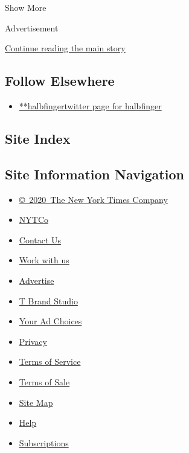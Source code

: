 Show More

Advertisement

\protect\hyperlink{after-mid2}{Continue reading the main story}

\hypertarget{follow-elsewhere}{%
\subsection{Follow Elsewhere}\label{follow-elsewhere}}

\begin{itemize}
\tightlist
\item
  \href{https://twitter.com/halbfinger}{**halbfingertwitter page for
  halbfinger}
\end{itemize}

\hypertarget{site-index}{%
\subsection{Site Index}\label{site-index}}

\hypertarget{site-information-navigation}{%
\subsection{Site Information
Navigation}\label{site-information-navigation}}

\begin{itemize}
\tightlist
\item
  \href{https://help.nytimes3xbfgragh.onion/hc/en-us/articles/115014792127-Copyright-notice}{©~2020~The
  New York Times Company}
\end{itemize}

\begin{itemize}
\tightlist
\item
  \href{https://www.nytco.com/}{NYTCo}
\item
  \href{https://help.nytimes3xbfgragh.onion/hc/en-us/articles/115015385887-Contact-Us}{Contact
  Us}
\item
  \href{https://www.nytco.com/careers/}{Work with us}
\item
  \href{https://nytmediakit.com/}{Advertise}
\item
  \href{http://www.tbrandstudio.com/}{T Brand Studio}
\item
  \href{https://www.nytimes3xbfgragh.onion/privacy/cookie-policy\#how-do-i-manage-trackers}{Your
  Ad Choices}
\item
  \href{https://www.nytimes3xbfgragh.onion/privacy}{Privacy}
\item
  \href{https://help.nytimes3xbfgragh.onion/hc/en-us/articles/115014893428-Terms-of-service}{Terms
  of Service}
\item
  \href{https://help.nytimes3xbfgragh.onion/hc/en-us/articles/115014893968-Terms-of-sale}{Terms
  of Sale}
\item
  \href{https://spiderbites.nytimes3xbfgragh.onion}{Site Map}
\item
  \href{https://help.nytimes3xbfgragh.onion/hc/en-us}{Help}
\item
  \href{https://www.nytimes3xbfgragh.onion/subscription?campaignId=37WXW}{Subscriptions}
\end{itemize}
